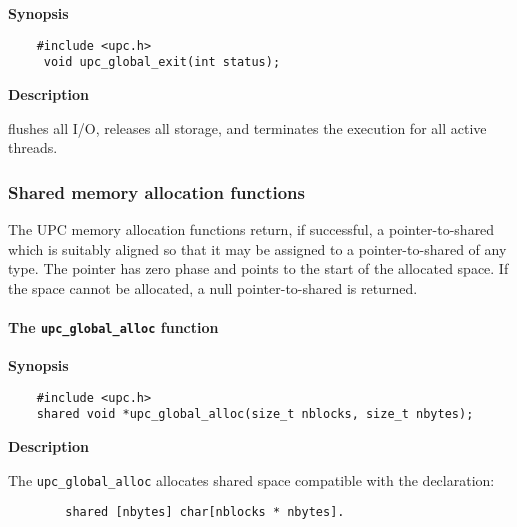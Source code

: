 {\bf Synopsis} 

\npf\vspace{-2.5em}
\begin{verbatim}
    #include <upc.h> 
     void upc_global_exit(int status);
\end{verbatim}

{\bf Description}

 flushes all I/O, releases all
      storage, and terminates the execution for all active threads.

\subsubsection{Shared memory allocation functions}
\label{shared_allocation}

\npf The UPC memory allocation functions return, if successful,
    a pointer-to-shared which is suitably aligned so that it may be assigned 
    to a pointer-to-shared of any type.  The pointer has zero phase and points
    to the start of the allocated space.  If the space cannot be allocated, a null
    pointer-to-shared is returned.
    
\np {}

\paragraph{The {\tt upc\_global\_alloc} function}

{\bf Synopsis} 

\npf\vspace{-2.5em}
\begin{verbatim}
    #include <upc.h> 
    shared void *upc_global_alloc(size_t nblocks, size_t nbytes); 
\end{verbatim}

{\bf Description}

\np The {\tt upc\_global\_alloc} allocates shared space
     compatible with the declaration:

\begin{verbatim}
        shared [nbytes] char[nblocks * nbytes]. 
\end{verbatim}

